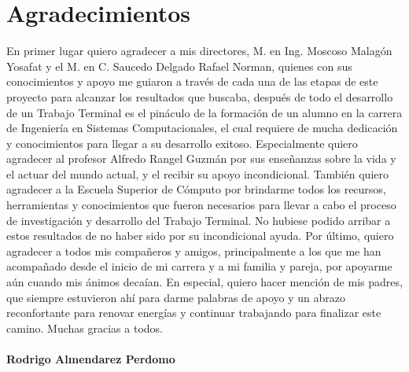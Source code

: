 \section*{Agradecimientos}
\vspace*{\fill}
En primer lugar quiero agradecer a mis directores, M. en Ing. Moscoso Malagón Yosafat y el M. en C. Saucedo Delgado Rafael Norman, quienes con sus conocimientos y apoyo me guiaron a través de cada una de las etapas de este proyecto para alcanzar los resultados que buscaba, después de todo el  desarrollo de un Trabajo Terminal es el pináculo de  la formación de un alumno en la carrera de Ingeniería en Sistemas Computacionales, el cual requiere de mucha dedicación y conocimientos para llegar a su desarrollo exitoso.
Especialmente quiero agradecer al profesor Alfredo Rangel Guzmán por sus enseñanzas sobre la vida y el actuar del mundo actual, y el recibir su apoyo incondicional.
También quiero agradecer a la Escuela Superior de Cómputo por brindarme todos los recursos, herramientas y conocimientos que fueron necesarios para llevar a cabo el proceso de investigación y desarrollo del Trabajo Terminal. No hubiese podido arribar a estos resultados de no haber sido por su incondicional ayuda.
Por último, quiero agradecer a todos mis compañeros y amigos, principalmente a los que me han acompañado desde el inicio de mi carrera y a mi familia y pareja, por apoyarme aún cuando mis ánimos decaían. En especial, quiero hacer mención de mis padres, que siempre estuvieron ahí para darme palabras de apoyo y un abrazo reconfortante para renovar energías y continuar trabajando para finalizar este camino.
Muchas gracias a todos.
\vspace*{\fill}
\paragraph{Rodrigo Almendarez Perdomo}

